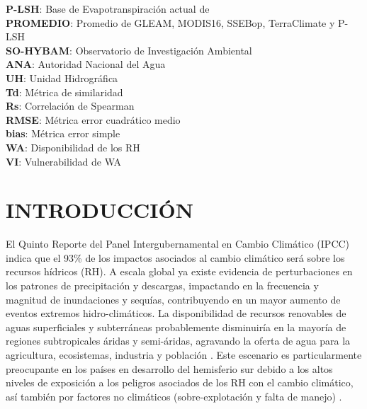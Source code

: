 \documentclass[12pt]{article}
\begin{document}
\textbf{P-LSH}: Base de Evapotranspiración actual de \citet{zhang2015vegetation} \\
\textbf{PROMEDIO}: Promedio de GLEAM, MODIS16, SSEBop, TerraClimate y P-LSH \\
\textbf{SO-HYBAM}: Observatorio de Investigación Ambiental \\
\textbf{ANA}: Autoridad Nacional del Agua \\
\textbf{UH}: Unidad Hidrográfica \\
\textbf{Td}: Métrica de similaridad \\
\textbf{Rs}: Correlación de Spearman \\
\textbf{RMSE}: Métrica error cuadrático medio \\
\textbf{bias}: Métrica error simple \\
\textbf{WA}: Disponibilidad de los RH \\
\textbf{VI}: Vulnerabilidad de WA \\

\clearpage




\clearpage
\vspace*{0.5mm}
\section{INTRODUCCIÓN}

\thispagestyle{empty}

El Quinto Reporte del Panel Intergubernamental en Cambio Climático (IPCC) \citep{Field2014} indica que el 93\% de los impactos asociados al cambio climático será sobre los recursos hídricos (RH). A escala global ya existe evidencia de perturbaciones en los patrones de precipitación y descargas, impactando en la frecuencia y magnitud de inundaciones y sequías, contribuyendo en un mayor aumento de eventos extremos hidro-climáticos. La disponibilidad de recursos renovables de aguas superficiales y subterráneas probablemente disminuiría en la mayoría de regiones subtropicales áridas y semi-áridas, agravando la oferta de agua para la agricultura, ecosistemas, industria y población \citep{Field2014}. Este escenario es particularmente preocupante en los países en desarrollo del hemisferio sur \citep{Satterthwaite2012} debido a los altos niveles de exposición a los peligros asociados de los RH con el cambio climático, así también por factores no climáticos (sobre-explotación y falta de manejo) \citep{MacAlister2018}.
\end{document}
